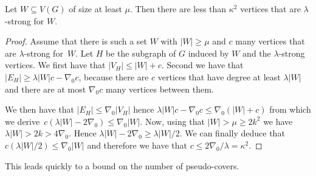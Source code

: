 \begin{lemma}\label{lem:num-high-degree}
  Let $W\subseteq V(G)$ of size at least $\mu$.
  Then there are less than $\kappa^2$ vertices that are
  $\lambda$-strong for $W$.
\end{lemma}
\begin{proof}
  Assume that there is such a set $W$ with $|W|\ge \mu$ and
  $c$ many vertices that are $\lambda$-strong for~$W$.
  Let $H$ be the subgraph of $G$ induced by $W$ and the $\lambda$-strong vertices.
  We first have that $|V_H| \le |W|+c$. Second we have that
  $|E_H|\ge \lambda|W|c-\nabla_0c$, because there are $c$ vertices that have
  degree at least $\lambda|W|$ and there are at most $\nabla_0c$ many vertices
  between them.

\pagebreak
  We then have that $|E_H|\le \nabla_0|V_H|$ hence
  $\lambda|W|c-\nabla_0c\le \nabla_0(|W|+c)$ from which we
  derive~$c(\lambda |W|-2\nabla_0)\le \nabla_0|W|$.
  Now, using that $|W|>\mu\ge 2k^2$ we have $\lambda|W|>2k>4\nabla_0$.
  Hence $\lambda|W|-2\nabla_0 \ge \lambda|W|/2$.
  We can finally deduce that $c(\lambda|W|/2)\le \nabla_0|W|$ and therefore we
  have that $c\le 2\nabla_0/\lambda=\kappa^2$.
\end{proof}


This leads quickly to a bound on the number of pseudo-covers.

%
%
%
%

